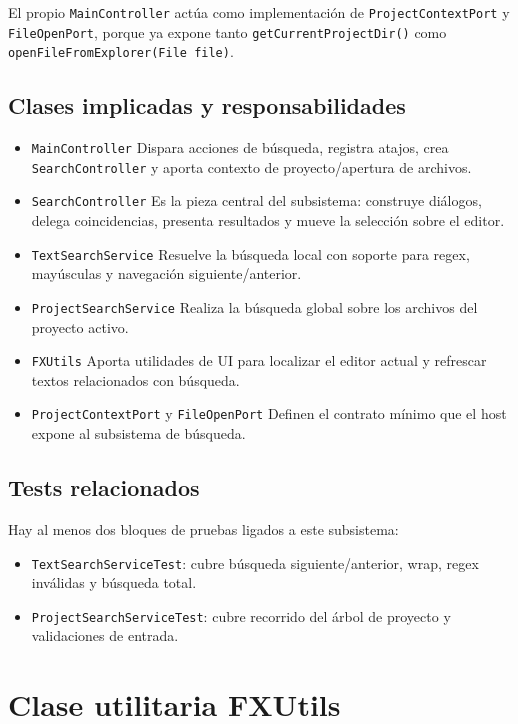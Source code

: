 \documentclass[../../main.tex]{subfiles}
\begin{document}
El propio \lstinline|MainController| actúa como implementación de \lstinline|ProjectContextPort| y \lstinline|FileOpenPort|, porque ya expone tanto \lstinline|getCurrentProjectDir()| como \lstinline|openFileFromExplorer(File file)|.

\subsection{Clases implicadas y responsabilidades}

\begin{itemize}
    \item \lstinline|MainController| Dispara acciones de búsqueda, registra atajos, crea \lstinline|SearchController| y aporta contexto de proyecto/apertura de archivos.
    \item \lstinline|SearchController| Es la pieza central del subsistema: construye diálogos, delega coincidencias, presenta resultados y mueve la selección sobre el editor.
    \item \lstinline|TextSearchService| Resuelve la búsqueda local con soporte para regex, mayúsculas y navegación siguiente/anterior.
    \item \lstinline|ProjectSearchService| Realiza la búsqueda global sobre los archivos del proyecto activo.
    \item \lstinline|FXUtils| Aporta utilidades de UI para localizar el editor actual y refrescar textos relacionados con búsqueda.
    \item \lstinline|ProjectContextPort| y \lstinline|FileOpenPort| Definen el contrato mínimo que el host expone al subsistema de búsqueda.
\end{itemize}

\subsection{Tests relacionados}

Hay al menos dos bloques de pruebas ligados a este subsistema:
\begin{itemize}
    \item \lstinline|TextSearchServiceTest|: cubre búsqueda siguiente/anterior, wrap, regex inválidas y búsqueda total.
    \item \lstinline|ProjectSearchServiceTest|: cubre recorrido del árbol de proyecto y validaciones de entrada.
\end{itemize}

\section{Clase utilitaria FXUtils}
\end{document}
